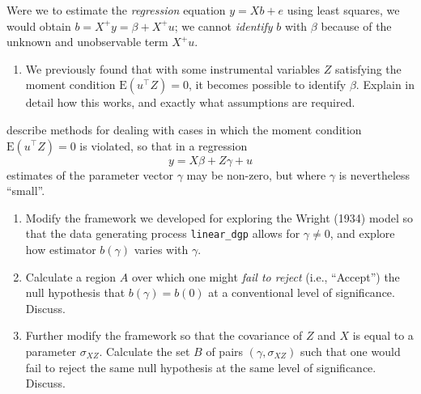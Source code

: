 \documentclass[12pt]{amsart}
\newcommand{\T}{\top}
\begin{document}
Were we to estimate the \emph{regression} equation \(y = Xb + e\) using least
squares, we would obtain \(b=X^+y = \beta + X^+u\); we cannot \emph{identify} \(b\)
with \(\beta\) because of the unknown and unobservable term \(X^+u\).

\begin{enumerate}
\item We previously found that with some instrumental variables \(Z\)
satisfying the moment condition \(\mbox{E}(u^\T Z)=0\), it becomes possible
to identify \(\beta\).  Explain in detail how this works, and exactly
what assumptions are required.
\end{enumerate}

\textcite{conley-etal12} describe methods for dealing with cases in which
the moment condition \(\mbox{E}(u^\T Z)=0\) is violated, so that in a regression
\begin{equation}
   y = X\beta + Z\gamma + u
\end{equation}
estimates of the parameter vector \(\gamma\) may be non-zero, but where
\(\gamma\) is nevertheless ``small''.

\begin{enumerate}
\item Modify the framework we developed for exploring the  Wright (1934)
model so that the data generating process \texttt{linear\_dgp} allows for \(\gamma\neq
   0\), and explore how estimator \(b(\gamma)\) varies with
\(\gamma\).

\item Calculate a region \(A\) over which one might \emph{fail to reject} (i.e.,
``Accept'') the null hypothesis that \(b(\gamma)=b(0)\) at a
conventional level of significance.  Discuss.

\item Further modify the framework so that the covariance of \(Z\) and
\(X\) is equal to a parameter \(\sigma_{XZ}\).  Calculate the set
\(B\) of pairs \((\gamma,\sigma_{XZ})\) such that one would fail to
reject the same null hypothesis at the same level of significance.
Discuss.
\end{enumerate}
\end{document}
